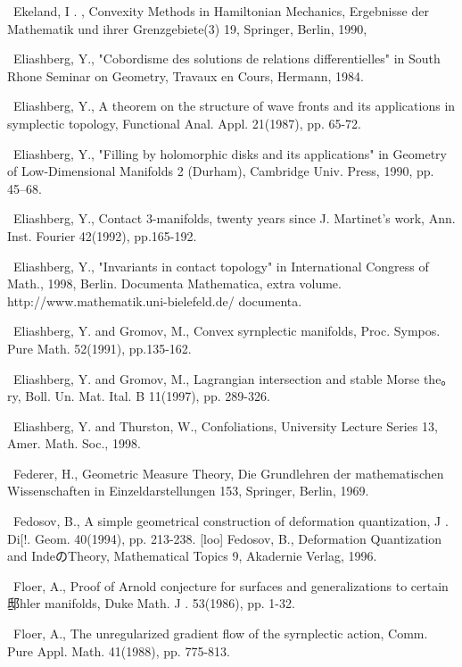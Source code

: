 {\noindent [89]\ Ekeland, I . , Convexity Methods in Hamiltonian Mechanics, Ergebnisse der Mathematik und ihrer Grenzgebiete(3) 19, Springer, Berlin, 1990,\par\smallskip
\noindent [90]\ Eliashberg, Y., "Cobordisme des solutions de relations differentielles" in South Rhone Seminar on Geometry, Travaux en Cours, Hermann, 1984.\par\smallskip
\noindent [91]\ Eliashberg, Y., A theorem on the structure of wave fronts and its applications in symplectic topology, Functional Anal. Appl. 21(1987), pp. 65-72.\par\smallskip
\noindent [92]\ Eliashberg, Y., "Filling by holomorphic disks and its applications" in Geometry of Low-Dimensional Manifolds 2 (Durham), Cambridge Univ. Press, 1990, pp. 45--68.\par\smallskip
\noindent [93]\ Eliashberg, Y., Contact 3-manifolds, twenty years since J. Martinet's work, Ann. Inst. Fourier 42(1992), pp.165-192.\par\smallskip
\noindent [94]\ Eliashberg, Y., "Invariants in contact topology" in International Congress of Math., 1998, Berlin. Documenta Mathematica, extra volume. http://www.mathematik.uni-bielefeld.de/ documenta.\par\smallskip
\noindent [95]\ Eliashberg, Y. and Gromov, M., Convex syrnplectic manifolds, Proc. Sympos. Pure Math. 52(1991), pp.135-162.\par\smallskip
\noindent [96]\ Eliashberg, Y. and Gromov, M., Lagrangian intersection and stable Morse the。ry, Boll. Un. Mat. Ital. B 11(1997), pp. 289-326.\par\smallskip
\noindent [97]\ Eliashberg, Y. and Thurston, W., Confoliations, University Lecture Series 13, Amer. Math. Soc., 1998.\par\smallskip
\noindent [98]\ Federer, H., Geometric Measure Theory, Die Grundlehren der mathematischen Wissenschaften in Einzeldarstellungen 153, Springer, Berlin, 1969.\par\smallskip
\noindent [99]\ Fedosov, B., A simple geometrical construction of deformation quantization, J . Di[!. Geom. 40(1994), pp. 213-238. [loo] Fedosov, B., Deformation Quantization and IndeのTheory, Mathematical Topics 9, Akadernie Verlag, 1996.\par\smallskip
\noindent [101]\ Floer, A., Proof of Arnold conjecture for surfaces and generalizations to certain 邸hler manifolds, Duke Math. J . 53(1986), pp. 1-32.\par\smallskip
\noindent [102]\ Floer, A., The unregularized gradient flow of the syrnplectic action, Comm. Pure Appl. Math. 41(1988), pp. 775-813.\par\smallskip
}
